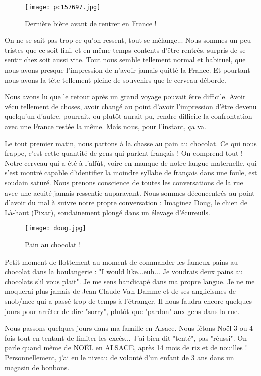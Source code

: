 \documentclass{book}
\begin{document}
\begin{figure}[H]
\centering
\texttt{[image: pc157697.jpg]}
\caption*{Dernière bière avant de rentrer en France !}
\end{figure}

On ne se sait pas trop ce qu'on ressent, tout se mélange... Nous sommes un peu tristes que ce soit fini, et en même temps contents d'être rentrés, surpris de se sentir chez soit aussi vite. Tout nous semble tellement normal et habituel, que nous avons presque l'impression de n'avoir jamais quitté la France. Et pourtant nous avons la tête tellement pleine de souvenirs que le cerveau déborde.

Nous avons lu que le retour après un grand voyage pouvait être difficile. Avoir vécu tellement de choses, avoir changé au point d'avoir l'impression d'être devenu quelqu'un d'autre, pourrait, ou plutôt aurait pu, rendre difficile la confrontation avec une France restée la même. Mais nous, pour l'instant, ça va.

Le tout premier matin, nous partons à la chasse au pain au chocolat. Ce qui nous frappe, c'est cette quantité de gens qui parlent français ! On comprend tout ! Notre cerveau qui a été à l’affût, voire en manque de notre langue maternelle, qui s'est montré capable d'identifier la moindre syllabe de français dans une foule, est soudain saturé. Nous prenons conscience de toutes les conversations de la rue avec une acuité jamais ressentie auparavant. Nous sommes déconcentrés au point d'avoir du mal à suivre notre propre conversation : Imaginez Doug, le chien de Là-haut (Pixar), soudainement plongé dans un élevage d'écureuils.


\begin{figure}[H]
\centering
\texttt{[image: doug.jpg]}
\caption*{Pain au chocolat !}
\end{figure}

Petit moment de flottement au moment de commander les fameux pains au chocolat dans la boulangerie : "I would like...euh... Je voudrais deux pains au chocolats s'il vous plait". Je me sens handicapé dans ma propre langue. Je ne me moquerai plus jamais de Jean-Claude Van Damme et de ses anglicismes de snob/mec qui a passé trop de temps à l'étranger. Il nous faudra encore quelques jours pour arrêter de dire "sorry", plutôt que "pardon" aux gens dans la rue.

Nous passons quelques jours dans ma famille en Alsace. Nous fêtons Noël 3 ou 4 fois tout en tentant de limiter les excès... J'ai bien dit "tenté", pas "réussi". On parle quand même de NOËL en ALSACE, après 14 mois de riz et de nouilles ! Personnellement, j'ai eu le niveau de volonté d'un enfant de 3 ans dans un magasin de bonbons.
\end{document}

